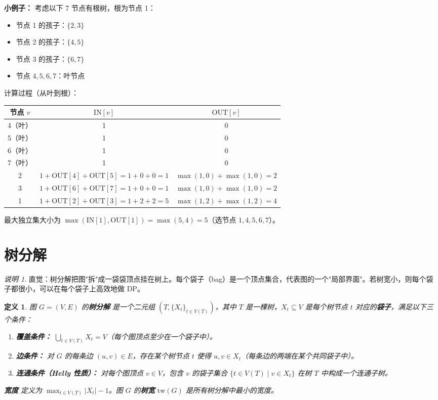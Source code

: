 \documentclass[UTF8,openany,12pt]{ctexbook}
\newtheorem{definition}{定义}[chapter]
\theoremstyle{remark}
\newtheorem{remark}{说明}[chapter]
\begin{document}
\textbf{小例子：} 考虑以下 7 节点有根树，根为节点 1：

\begin{itemize}
  \item 节点 1 的孩子：$\{2, 3\}$
  \item 节点 2 的孩子：$\{4, 5\}$
  \item 节点 3 的孩子：$\{6, 7\}$
  \item 节点 $4,5,6,7$：叶节点
\end{itemize}

计算过程（从叶到根）：

\begin{center}
\begin{tabular}{@{}ccc@{}}
\toprule
节点 $v$ & $\mathrm{IN}[v]$ & $\mathrm{OUT}[v]$ \\
\midrule
4（叶）& 1 & 0 \\
5（叶）& 1 & 0 \\
6（叶）& 1 & 0 \\
7（叶）& 1 & 0 \\
2 & $1+\mathrm{OUT}[4]+\mathrm{OUT}[5]=1+0+0=1$ & $\max(1,0)+\max(1,0)=2$ \\
3 & $1+\mathrm{OUT}[6]+\mathrm{OUT}[7]=1+0+0=1$ & $\max(1,0)+\max(1,0)=2$ \\
1 & $1+\mathrm{OUT}[2]+\mathrm{OUT}[3]=1+2+2=5$ & $\max(1,2)+\max(1,2)=4$ \\
\bottomrule
\end{tabular}
\end{center}

最大独立集大小为 $\max(\mathrm{IN}[1], \mathrm{OUT}[1]) = \max(5,4) = 5$（选节点 $1,4,5,6,7$）。

\section{树分解}

\begin{remark}
直觉：树分解把图"拆"成一袋袋顶点挂在树上。每个袋子（bag）是一个顶点集合，代表图的一个"局部界面"。若树宽小，则每个袋子都很小，可以在每个袋子上高效地做 DP。
\end{remark}

\begin{definition}
图 $G = (V, E)$ 的\textbf{树分解} 是一个二元组 $(T, \{X_t\}_{t \in V(T)})$，其中 $T$ 是一棵树，$X_t \subseteq V$ 是每个树节点 $t$ 对应的\textbf{袋子}，满足以下三个条件：
\begin{enumerate}
  \item \textbf{覆盖条件：} $\bigcup_{t \in V(T)} X_t = V$（每个图顶点至少在一个袋子中）。
  \item \textbf{边条件：} 对 $G$ 的每条边 $(u,v) \in E$，存在某个树节点 $t$ 使得 $u, v \in X_t$（每条边的两端在某个共同袋子中）。
  \item \textbf{连通条件（Helly 性质）：} 对每个图顶点 $v \in V$，包含 $v$ 的袋子集合 $\{t \in V(T) \mid v \in X_t\}$ 在树 $T$ 中构成一个连通子树。
\end{enumerate}
\textbf{宽度} 定义为 $\max_{t \in V(T)} |X_t| - 1$。图 $G$ 的\textbf{树宽} $\mathrm{tw}(G)$ 是所有树分解中最小的宽度。
\end{definition}
\end{document}
